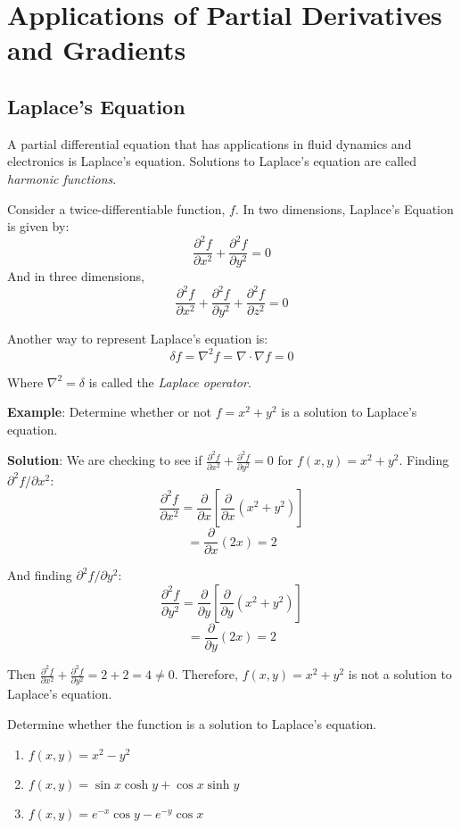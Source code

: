\section{Applications of Partial Derivatives and Gradients}

\subsection{Laplace's Equation}
A partial differential equation that has applications in fluid dynamics and 
electronics is Laplace's equation. Solutions to 
Laplace's equation are called \textit{harmonic functions}. 

\begin{mdframed}[style = important, frametitle = {Laplace's Equation}]
Consider a twice-differentiable function, $f$. In two dimensions, Laplace's 
Equation is given by:
$$ \frac{\partial ^2 f}{\partial x^2} + \frac{\partial^2 f}{\partial y^2} = 0$$
And in three dimensions, 
$$\frac{\partial ^2 f}{\partial x^2} + \frac{\partial ^2 f}{\partial y^2} + 
\frac{\partial ^2 f}{\partial z^2} = 0$$
\end{mdframed}

Another way to represent Laplace's equation is:
$$\delta f = \nabla^2 f = \nabla \cdot \nabla f = 0$$

Where $\nabla ^2 = \delta$ is called the \textit{Laplace operator}. 

\textbf{Example}: Determine whether or not $f = x^2 + y^2$ is a solution to 
Laplace's equation. 

\textbf{Solution}: We are checking to see if $\frac{\partial^2 f}{\partial 
x^2} + \frac{\partial^2 f}{\partial y^2} = 0$ for $f(x, y) = x^2 + y^2$. 
Finding $\partial^2 f / \partial x^2$:
$$\frac{\partial^2 f}{\partial x^2} = \frac{\partial}{\partial x} \left[ \frac{
\partial}{\partial x} \left( x^2 + y^2 \right) \right]$$
$$= \frac{\partial}{\partial x} \left( 2x \right) = 2$$

And finding $\partial^2 f / \partial y^2$:
$$\frac{\partial^2 f}{\partial y^2} = \frac{\partial}{\partial y} \left[ \frac{
\partial}{\partial y} \left( x^2 + y^2 \right) \right]$$
$$= \frac{\partial}{\partial y} \left( 2x \right) = 2$$

Then $\frac{\partial^2 f}{\partial x^2} + \frac{\partial^2 f}{\partial y^2} = 
2 + 2 = 4 \neq 0$. Therefore, $f(x, y) = x^2 + y^2$ is not a solution to 
Laplace's equation. 

\begin{Exercise}[title = {Solutions to Laplace's Equation}, label = laplace]
Determine whether the function is a solution to Laplace's equation. 
\begin{enumerate}
    \item $f(x, y) = x^2 - y^2$
    \item $f(x, y) = \sin{x} \cosh{y} + \cos{x} \sinh{y}$
    \item $f(x, y) = e^{-x} \cos{y} - e^{-y} \cos{x}$
\end{enumerate}
\vspace{50mm}
\end{Exercise}

